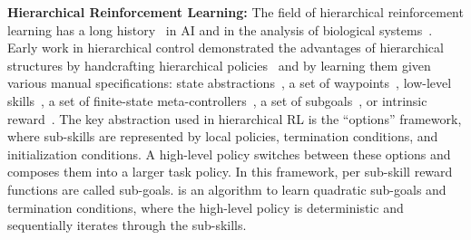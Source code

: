 \vspace{0.5em}\noindent\textbf{Hierarchical Reinforcement Learning: } 
The field of hierarchical reinforcement learning has a long history~\citep{parr98,suttonPS99,barto03} in AI and in the analysis of biological systems~\citep{botvinick08,botvinick2009hierarchically,solway2014optimal,zacksKEH11,whitenFBL06}.
Early work in hierarchical control demonstrated the advantages of hierarchical structures by handcrafting hierarchical policies~\citep{brooks1986robust} and by learning them given various manual specifications: state abstractions~\citep{dayanH92,hengst02,kolterAN07,konidarisB07}, a set of waypoints~\citep{kaelbling93}, low-level skills~\citep{huberG97,baconP15,liaw17composing}, a set of finite-state meta-controllers~\citep{parrR97}, a set of subgoals~\citep{suttonPS99,dietterich00}, or intrinsic reward~\citep{kulkarni2016hierarchical}.
The key abstraction used in hierarchical RL is the ``options'' framework, where sub-skills are represented by local policies, termination conditions, and initialization conditions.
A high-level policy switches between these options and composes them into  a larger task policy.
In this framework, per sub-skill reward functions are called sub-goals. \hirl is an algorithm to learn quadratic sub-goals and termination conditions, where the high-level policy is deterministic and sequentially iterates through the sub-skills. 


